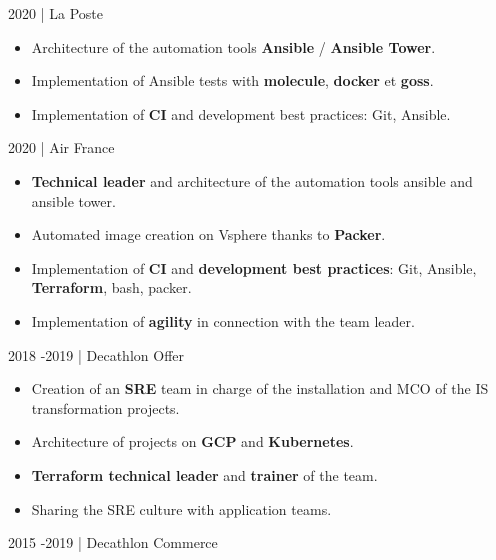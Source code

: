 \documentclass[
	a4paper,
	maincolor=cvartifakt,
	sidecolor=cvgray,
	sidebartextcolor=cvwhite,
	sectioncolor=cvartifakt,
	subsectioncolor=cvgray,
	sidebarwidth=0.36\paperwidth,
    topbottommargin=0.04\paperheight,
]{fortysecondscv}
\makeatletter
\newcommand\thefontsize{\f@size pt}
\makeatother
\begin{document}
\makefrontsidebar{}

\begin{cvtable}[2]
	    {
	    \textcolor{maincolor}{2020 | La Poste}
	    \begin{itemize}
            \item Architecture of the automation tools \textbf{Ansible} / \textbf{Ansible Tower}.
            \item Implementation of Ansible tests with \textbf{molecule}, \textbf{docker} et \textbf{goss}.
            \item Implementation of \textbf{CI} and development best practices: Git, Ansible.
        \end{itemize}
        \vspace{8pt}
	    \textcolor{maincolor}{2020 | Air France}
	    \begin{itemize}
            \item \textbf{Technical leader} and architecture of the automation tools ansible and ansible tower.
            \item Automated image creation on Vsphere thanks to \textbf{Packer}.
            \item Implementation of \textbf{CI} and \textbf{development best practices}: Git, Ansible, \textbf{Terraform}, bash, packer.
            \item Implementation of \textbf{agility} in connection with the team leader.
        \end{itemize}
		}
	    {
	    \textcolor{maincolor}{2018 -2019 | Decathlon Offer}
	    \begin{itemize}
            \item Creation of an \textbf{SRE} team in charge of the installation and MCO of the IS transformation projects.
            \item Architecture of projects on \textbf{GCP} and \textbf{Kubernetes}.
            \item \textbf{Terraform technical leader} and \textbf{trainer} of the team.
            \item Sharing the SRE culture with application teams.
        \end{itemize}
        \vspace{8pt}
        \textcolor{maincolor}{2015 -2019 | Decathlon Commerce}
}
\end{cvtable}
\end{document}
